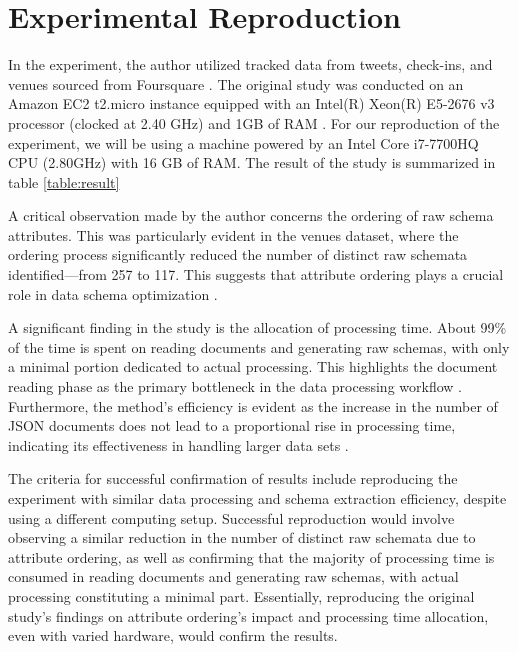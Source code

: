 \documentclass[sigconf, nonacm]{acmart}
\begin{document}
\section{Experimental Reproduction}

In the experiment, the author utilized tracked data from tweets, check-ins, and venues sourced from Foursquare \cite{ccelikten2016modeling}. The original study was conducted on an Amazon EC2 t2.micro instance equipped with an Intel(R) Xeon(R) E5-2676 v3 processor (clocked at 2.40 GHz) and 1GB of RAM \cite{frozza2018approach}. For our reproduction of the experiment, we will be using a machine powered by an Intel Core i7-7700HQ CPU (2.80GHz) with 16 GB of RAM. The result of the study is summarized in table \ref{table:result}

A critical observation made by the author concerns the ordering of raw schema attributes. This was particularly evident in the venues dataset, where the ordering process significantly reduced the number of distinct raw schemata identified—from 257 to 117. This suggests that attribute ordering plays a crucial role in data schema optimization \cite{frozza2018approach}. 

A significant finding in the study is the allocation of processing time. About 99\% of the time is spent on reading documents and generating raw schemas, with only a minimal portion dedicated to actual processing. This highlights the document reading phase as the primary bottleneck in the data processing workflow \cite{frozza2018approach}. Furthermore, the method's efficiency is evident as the increase in the number of JSON documents does not lead to a proportional rise in processing time, indicating its effectiveness in handling larger data sets \cite{frozza2018approach}.

The criteria for successful confirmation of results include reproducing the experiment with similar data processing and schema extraction efficiency, despite using a different computing setup. Successful reproduction would involve observing a similar reduction in the number of distinct raw schemata due to attribute ordering, as well as confirming that the majority of processing time is consumed in reading documents and generating raw schemas, with actual processing constituting a minimal part. Essentially, reproducing the original study's findings on attribute ordering's impact and processing time allocation, even with varied hardware, would confirm the results.
\end{document}
